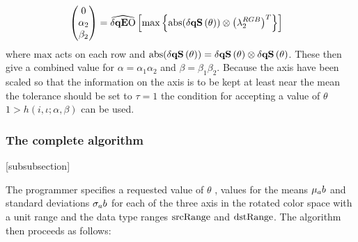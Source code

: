 \begin{align*}
 \begin{pmatrix}  0   \\   \alpha_2   \\  \beta_2   \\ \end{pmatrix}     &=  
\dqEO\left[  
\max \left\{\text{abs}(\dqs[\theta]) \otimes \left(\discard^{RGB}_2 \right)^T \right\}
\right]
\end{align*}
where $\text{max}$ acts on each row and $\text{abs}(\dqs[\theta])  = \dqs[\theta] \otimes \dqs[\theta]$. 
These then give a combined value for $\alpha = \alpha_1 \alpha_2$ and $\beta = \beta_1 \beta_2$. Because the axis have been scaled so that the information on the axis is to be kept at least near the mean the tolerance should be set to $\tau =1$ the condition for accepting a value of $\theta$ $1 > h(i,\iota; \alpha,\beta)$ can be used.

\subsubsection{The complete algorithm}

[subsubsection]
\newcommand{\algosection}[1]{\needspace{5\baselineskip} \stepcounter{algosection} \textbf{\thealgosection. #1} }

The programmer specifies a requested value of $\theta$ , values for the means $\mu_ ab$ and standard deviations $\sigma_ ab$ for each of the three axis in the rotated color space with a unit range and the data type ranges $\text{srcRange}$ and $\text{dstRange}$. The algorithm then proceeds as follows:

